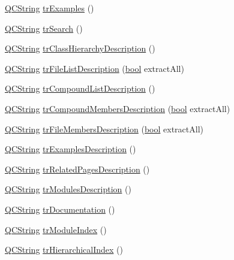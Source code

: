 \begin{DoxyCompactItemize}
\hyperlink{class_q_c_string}{Q\+C\+String} \hyperlink{class_translator_portuguese_af6b3271c54d8083d9a2a91a737b4e2f8}{tr\+Examples} ()
\item 
\hyperlink{class_q_c_string}{Q\+C\+String} \hyperlink{class_translator_portuguese_a0197c0988d3e7af1baf12764e67c8592}{tr\+Search} ()
\item 
\hyperlink{class_q_c_string}{Q\+C\+String} \hyperlink{class_translator_portuguese_aee36524c0b27b8223292c60f3ae48be2}{tr\+Class\+Hierarchy\+Description} ()
\item 
\hyperlink{class_q_c_string}{Q\+C\+String} \hyperlink{class_translator_portuguese_a837813311f9a4dbc0f7ec4aa9d1b8f24}{tr\+File\+List\+Description} (\hyperlink{qglobal_8h_a1062901a7428fdd9c7f180f5e01ea056}{bool} extract\+All)
\item 
\hyperlink{class_q_c_string}{Q\+C\+String} \hyperlink{class_translator_portuguese_a7bca0e0a84cb275ebdd1322183593ffa}{tr\+Compound\+List\+Description} ()
\item 
\hyperlink{class_q_c_string}{Q\+C\+String} \hyperlink{class_translator_portuguese_aabde76a5a9e8d21c289609f9b7f7065b}{tr\+Compound\+Members\+Description} (\hyperlink{qglobal_8h_a1062901a7428fdd9c7f180f5e01ea056}{bool} extract\+All)
\item 
\hyperlink{class_q_c_string}{Q\+C\+String} \hyperlink{class_translator_portuguese_a444f40e7a8ab2d3c6167220ec3a43b46}{tr\+File\+Members\+Description} (\hyperlink{qglobal_8h_a1062901a7428fdd9c7f180f5e01ea056}{bool} extract\+All)
\item 
\hyperlink{class_q_c_string}{Q\+C\+String} \hyperlink{class_translator_portuguese_a2923bc757e192fb65a4c22ae7298bb51}{tr\+Examples\+Description} ()
\item 
\hyperlink{class_q_c_string}{Q\+C\+String} \hyperlink{class_translator_portuguese_a59f2f6a19ff379367a1a013c6fa81e61}{tr\+Related\+Pages\+Description} ()
\item 
\hyperlink{class_q_c_string}{Q\+C\+String} \hyperlink{class_translator_portuguese_a254dcfdbf76d284abdb0d03db54fc5f0}{tr\+Modules\+Description} ()
\item 
\hyperlink{class_q_c_string}{Q\+C\+String} \hyperlink{class_translator_portuguese_afa49d1abe37028f7b3defd3f067157ed}{tr\+Documentation} ()
\item 
\hyperlink{class_q_c_string}{Q\+C\+String} \hyperlink{class_translator_portuguese_a98d569061b576d52ac3a20485a3bea74}{tr\+Module\+Index} ()
\item 
\hyperlink{class_q_c_string}{Q\+C\+String} \hyperlink{class_translator_portuguese_a46fb7c3e8866eb4734dce3cf93d8644b}{tr\+Hierarchical\+Index} ()

\end{DoxyCompactItemize}
